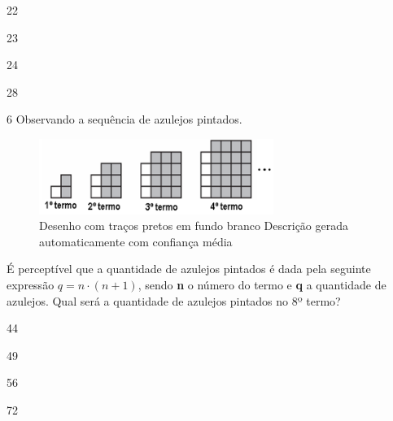 {{{\begin{escolha}
{{{{\begin{escolha}
\begin{escolha}
{\begin{escolha}
\begin{escolha}
\begin{escolha}
\begin{escolha}
\begin{escolha}
\begin{escolha}
{{\begin{escolha}

  \item 22

  \item 23

  \item 24

  \item 28

\end{escolha}


\num{6} Observando a sequência de azulejos pintados.

\begin{figure}
\centering
\includegraphics[width=3in,height=0.96526in]{./_SAEB_9_MAT/media/image270.png}
\caption{Desenho com traços pretos em fundo branco Descrição gerada
automaticamente com confiança média}
\end{figure}


É perceptível que a quantidade de azulejos pintados é dada pela
seguinte expressão $q = n \cdot (n + 1)$, sendo \textbf{n} o número do termo 
e \textbf{q} a quantidade de azulejos. Qual será a quantidade de azulejos
pintados no 8º termo?

\begin{escolha}

\item 44

\item 49

\item 56

\item 72


\end{escolha}}}
\end{escolha}
\end{escolha}
\end{escolha}
\end{escolha}
\end{escolha}
\end{escolha}}
\end{escolha}
\end{escolha}}}}}
\end{escolha}}}}
